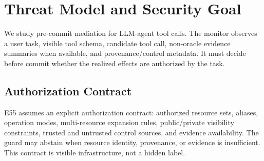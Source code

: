 \section{Threat Model and Security Goal}
We study pre-commit mediation for LLM-agent tool calls. The monitor observes a user task, visible tool schema, candidate tool call, non-oracle evidence summaries when available, and provenance/control metadata. It must decide before commit whether the realized effects are authorized by the task.

\subsection{Authorization Contract}
E55 assumes an explicit authorization contract: authorized resource sets, aliases, operation modes, multi-resource expansion rules, public/private visibility constraints, trusted and untrusted control sources, and evidence availability. The guard may abstain when resource identity, provenance, or evidence is insufficient. This contract is visible infrastructure, not a hidden label.
